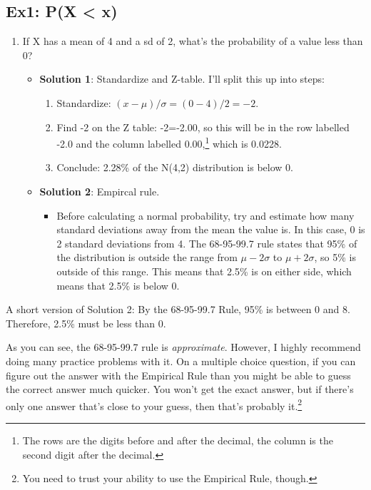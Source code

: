 \documentclass[
  letterpaper,
  DIV=11,
  numbers=noendperiod]{scrreprt}
\providecommand{\tightlist}{%
  \setlength{\itemsep}{0pt}\setlength{\parskip}{0pt}}\usepackage{longtable,booktabs,array}
\begin{document}
\hypertarget{ex1-px-x}{%
\subsection{Ex1: P(X \textless{} x)}\label{ex1-px-x}}

\begin{enumerate}
\def\labelenumi{\arabic{enumi}.}
\tightlist
\item
  If X has a mean of 4 and a sd of 2, what's the probability of a value
  less than 0?

  \begin{itemize}
  \tightlist
  \item
    \textbf{Solution 1}: Standardize and Z-table. I'll split this up
    into steps:

    \begin{enumerate}
    \def\labelenumii{\arabic{enumii}.}
    \tightlist
    \item
      Standardize: \((x-\mu)/\sigma = (0 - 4)/2 = -2\).
    \item
      Find -2 on the Z table: -2=-2.00, so this will be in the row
      labelled -2.0 and the column labelled 0.00,\footnote{The rows are
        the digits before and after the decimal, the column is the
        second digit after the decimal.} which is 0.0228.
    \item
      Conclude: 2.28\% of the N(4,2) distribution is below 0.
    \end{enumerate}
  \item
    \textbf{Solution 2}: Empircal rule.

    \begin{itemize}
    \tightlist
    \item
      Before calculating a normal probability, try and estimate how many
      standard deviations away from the mean the value is. In this case,
      0 is 2 standard deviations from 4. The 68-95-99.7 rule states that
      95\% of the distribution is outside the range from
      \(\mu - 2\sigma\) to \(\mu + 2\sigma\), so 5\% is outside of this
      range. This means that 2.5\% is on either side, which means that
      2.5\% is below 0.
    \end{itemize}
  \end{itemize}
\end{enumerate}

A short version of Solution 2: By the 68-95-99.7 Rule, 95\% is between 0
and 8. Therefore, 2.5\% must be less than 0.

As you can see, the 68-95-99.7 rule is \emph{approximate}. However, I
highly recommend doing many practice problems with it. On a multiple
choice question, if you can figure out the answer with the Empirical
Rule than you might be able to guess the correct answer much quicker.
You won't get the exact answer, but if there's only one answer that's
close to your guess, then that's probably it.\footnote{You need to trust
  your ability to use the Empirical Rule, though.}
\end{document}
